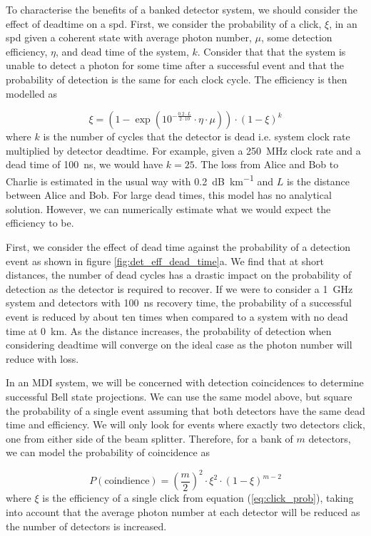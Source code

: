 To characterise the benefits of a banked detector system, we should consider the effect of deadtime on a \ac{spd}. First, we consider the probability of a click, $\xi$, in an \ac{spd} given a coherent state with average photon number, $\mu$, some detection efficiency, $\eta$, and dead time of the system, $k$. Consider that that the system is unable to detect a photon for some time after a successful event and that the probability of detection is the same for each clock cycle. The efficiency is then modelled as

\begin{equation}
	\label{eq:click_prob}
	\xi = ( 1 - \exp(10^{-\frac{0.2 \cdot L}{2 \cdot 10}} \cdot \eta \cdot \mu) ) \cdot (1 - \xi)^k
\end{equation}
where $k$ is the number of cycles that the detector is dead i.e. system clock rate multiplied by detector deadtime. For example, given a \SI{250}{\MHz} clock rate and a dead time of \SI{100}{ns}, we would have $k=25$. The loss from Alice and Bob to Charlie is estimated in the usual way with \SI{0.2}{dB\per\km} and $L$ is the distance between Alice and Bob. For large dead times, this model has no analytical solution. However, we can numerically estimate what we would expect the efficiency to be.

First, we consider the effect of dead time against the probability of a detection event as shown in figure \ref{fig:det_eff_dead_time}a. We find that at short distances, the number of dead cycles has a drastic impact on the probability of detection as the detector is required to recover. If we were to consider a \SI{1}{GHz} system and detectors with \SI{100}{ns} recovery time, the probability of a successful event is reduced by about ten times when compared to a system with no dead time at \SI{0}{\km}. As the distance increases, the probability of detection when considering deadtime will converge on the ideal case as the photon number will reduce with loss. 

In an \ac{MDI} system, we will be concerned with detection coincidences to determine successful Bell state projections. We can use the same model above, but square the probability of a single event assuming that both detectors have the same dead time and efficiency. We will only look for events where exactly two detectors click, one from either side of the beam splitter. Therefore, for a bank of $m$ detectors, we can model the probability of coincidence as

\begin{equation}
	P(\text{coindience}) = \left(\frac{m}{2}\right)^2 \cdot \xi^2 \cdot (1-\xi)^{m-2}
\end{equation}
where $\xi$ is the efficiency of a single click from equation (\ref{eq:click_prob}), taking into account that the average photon number at each detector will be reduced as the number of detectors is increased. 

